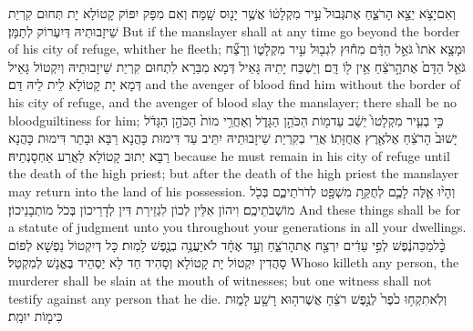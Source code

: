 {וְאִם\maqqaf יָצֹ֥א יֵצֵ֖א הָרֹצֵ֑חַ אֶת\maqqaf גְּבוּל֙ עִ֣יר מִקְלָט֔וֹ אֲשֶׁ֥ר יָנ֖וּס שָֽׁמָּה׃}
{וְאִם מִפָּק יִפּוֹק קָטוֹלָא יָת תְּחוּם קִרְיַת שֵׁיזָבוּתֵיהּ דְּיִעְרוֹק לְתַמָּן׃}
{But if the manslayer shall at any time go beyond the border of his city of refuge, whither he fleeth;}{}
{וּמָצָ֤א אֹתוֹ֙ גֹּאֵ֣ל הַדָּ֔ם מִח֕וּץ לִגְב֖וּל עִ֣יר מִקְלָט֑וֹ וְרָצַ֞ח גֹּאֵ֤ל הַדָּם֙ אֶת\maqqaf הָ֣רֹצֵ֔חַ אֵ֥ין ל֖וֹ דָּֽם׃}
{וְיַשְׁכַּח יָתֵיהּ גָּאֵיל דְּמָא מִבַּרָא לִתְחוּם קִרְיַת שֵׁיזָבוּתֵיהּ וְיִקְטוֹל גָּאֵיל דְּמָא יָת קָטוֹלָא לֵית לֵיהּ דַּם׃}
{and the avenger of blood find him without the border of his city of refuge, and the avenger of blood slay the manslayer; there shall be no bloodguiltiness for him;}{}
{כִּ֣י בְעִ֤יר מִקְלָטוֹ֙ יֵשֵׁ֔ב עַד\maqqaf מ֖וֹת הַכֹּהֵ֣ן הַגָּדֹ֑ל וְאַחֲרֵ֥י מוֹת֙ הַכֹּהֵ֣ן הַגָּדֹ֔ל יָשׁוּב֙ הָרֹצֵ֔חַ אֶל\maqqaf אֶ֖רֶץ אֲחֻזָּתֽוֹ׃}
{אֲרֵי בְקִרְיַת שֵׁיזָבוּתֵיהּ יִתֵּיב עַד דִּימוּת כָּהֲנָא רַבָּא וּבָתַר דִּימוּת כָּהֲנָא רַבָּא יְתוּב קָטוֹלָא לַאֲרַע אַחְסָנְתֵיהּ׃}
{because he must remain in his city of refuge until the death of the high priest; but after the death of the high priest the manslayer may return into the land of his possession.}{}
{וְהָי֨וּ אֵ֧לֶּה לָכֶ֛ם לְחֻקַּ֥ת מִשְׁפָּ֖ט לְדֹרֹתֵיכֶ֑ם בְּכֹ֖ל מוֹשְׁבֹתֵיכֶֽם׃}
{וִיהוֹן אִלֵּין לְכוֹן לִגְזֵירַת דִּין לְדָרֵיכוֹן בְּכֹל מוֹתְבָנֵיכוֹן׃}
{And these things shall be for a statute of judgment unto you throughout your generations in all your dwellings.}{}
{כׇּ֨ל\maqqaf מַכֵּה\maqqaf נֶ֔פֶשׁ לְפִ֣י עֵדִ֔ים יִרְצַ֖ח אֶת\maqqaf הָרֹצֵ֑חַ וְעֵ֣ד אֶחָ֔ד לֹא\maqqaf יַעֲנֶ֥ה בְנֶ֖פֶשׁ לָמֽוּת׃}
{כָּל דְּיִקְטוֹל נַפְשָׁא לְפוֹם סָהֲדִין יִקְטוֹל יָת קָטוֹלָא וְסָהִיד חַד לָא יַסְהֵיד בֶּאֱנָשׁ לְמִקְטַל׃}
{Whoso killeth any person, the murderer shall be slain at the mouth of witnesses; but one witness shall not testify against any person that he die.}{}
{וְלֹֽא\maqqaf תִקְח֥וּ כֹ֙פֶר֙ לְנֶ֣פֶשׁ רֹצֵ֔חַ אֲשֶׁר\maqqaf ה֥וּא רָשָׁ֖ע לָמ֑וּת כִּי\maqqaf מ֖וֹת יוּמָֽת׃}
